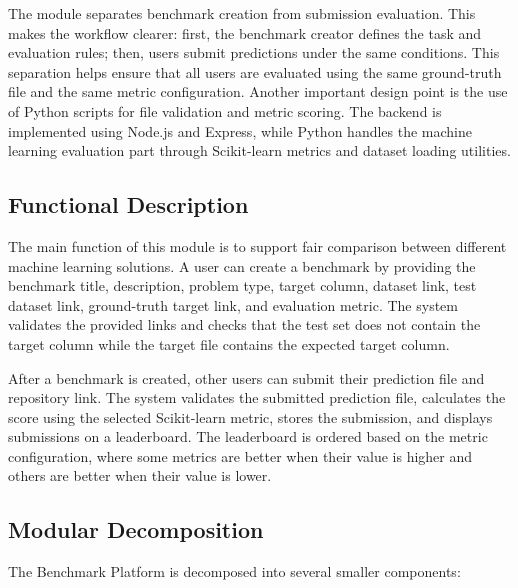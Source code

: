 \documentclass[12pt,a4paper]{report}
\begin{document}
\noindent The module separates benchmark creation from submission evaluation.
This makes the workflow clearer: first, the benchmark creator defines the task
and evaluation rules; then, users submit predictions under the same conditions.
This separation helps ensure that all users are evaluated using the same
ground-truth file and the same metric configuration. Another important design
point is the use of Python scripts for file validation and metric scoring. The
backend is implemented using Node.js and Express, while Python handles the
machine learning evaluation part through Scikit-learn metrics and dataset
loading utilities.

\subsection{Functional Description}
\noindent The main function of this module is to support fair comparison
between different machine learning solutions. A user can create a benchmark by
providing the benchmark title, description, problem type, target column,
dataset link, test dataset link, ground-truth target link, and evaluation
metric. The system validates the provided links and checks that the test set
does not contain the target column while the target file contains the expected
target column.

\noindent After a benchmark is created, other users can submit their prediction
file and repository link. The system validates the submitted prediction file,
calculates the score using the selected Scikit-learn metric, stores the
submission, and displays submissions on a leaderboard. The leaderboard is
ordered based on the metric configuration, where some metrics are better when
their value is higher and others are better when their value is lower.

\subsection{Modular Decomposition}
\noindent The Benchmark Platform is decomposed into several smaller components:
\end{document}
